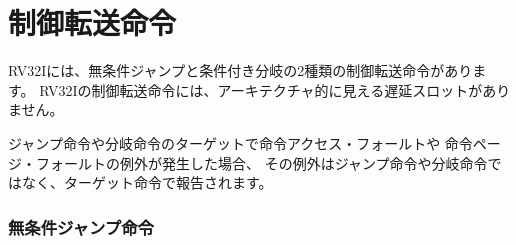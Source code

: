 \begin{comment}
\section{Control Transfer Instructions}
\end{comment}
\section{制御転送命令}

\begin{comment}
RV32I provides two types of control transfer instructions:
unconditional jumps and conditional branches.  Control transfer
instructions in RV32I do {\em not} have architecturally visible delay
slots.
\end{comment}

RV32Iには、無条件ジャンプと条件付き分岐の2種類の制御転送命令があります。
RV32Iの制御転送命令には、アーキテクチャ的に見える遅延スロットがありません。

\begin{comment}
If an instruction access-fault or instruction page-fault exception occurs
on the target of a jump or taken branch, the exception is reported on the
target instruction, not on the jump or branch instruction.
\end{comment}

ジャンプ命令や分岐命令のターゲットで命令アクセス・フォールトや
命令ページ・フォールトの例外が発生した場合、
その例外はジャンプ命令や分岐命令ではなく、ターゲット命令で報告されます。

\begin{comment}
\subsubsection*{Unconditional Jumps}
\end{comment}
\subsubsection*{無条件ジャンプ命令}

\begin{comment}
\vspace{-0.1in} The jump and link (JAL) instruction uses the J-type
format, where the J-immediate encodes a signed offset in multiples of
2 bytes.  The offset is sign-extended and added to the address of
the jump instruction
to form the jump target address.  Jumps can therefore target a
$\pm$\wunits{1}{MiB} range. JAL stores the address of the instruction
following the jump ({\tt pc}+4) into register {\em rd}.  The standard
software calling convention uses {\tt x1} as the return address
register and {\tt x5} as an alternate link register.
\end{comment}

